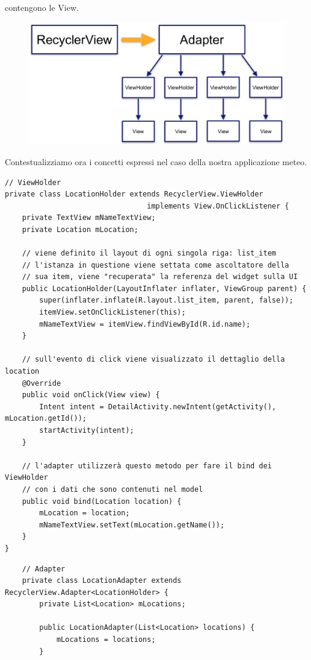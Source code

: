 \documentclass{article}
\begin{document}
\begin{itemize}
    contengono le View.
    \begin{figure}[H]
        \center
        \includegraphics[scale=0.28]{images/fig2.png}
    \end{figure}
    Contestualizziamo ora i concetti espressi nel caso della nostra applicazione meteo.
    \begin{lstlisting}
// ViewHolder
private class LocationHolder extends RecyclerView.ViewHolder
                                 implements View.OnClickListener {
    private TextView mNameTextView;
    private Location mLocation;

    // viene definito il layout di ogni singola riga: list_item
    // l'istanza in questione viene settata come ascoltatore della
    // sua item, viene "recuperata" la referenza del widget sulla UI
    public LocationHolder(LayoutInflater inflater, ViewGroup parent) {
        super(inflater.inflate(R.layout.list_item, parent, false));
        itemView.setOnClickListener(this);
        mNameTextView = itemView.findViewById(R.id.name);
    }

    // sull'evento di click viene visualizzato il dettaglio della location
    @Override
    public void onClick(View view) {
        Intent intent = DetailActivity.newIntent(getActivity(), mLocation.getId());
        startActivity(intent);
    }

    // l'adapter utilizzerà questo metodo per fare il bind dei ViewHolder
    // con i dati che sono contenuti nel model
    public void bind(Location location) {
        mLocation = location;
        mNameTextView.setText(mLocation.getName());
    }
}
    \end{lstlisting}
\begin{lstlisting}
    // Adapter
    private class LocationAdapter extends RecyclerView.Adapter<LocationHolder> {
        private List<Location> mLocations;

        public LocationAdapter(List<Location> locations) {
            mLocations = locations;
        }


\end{lstlisting}
\end{itemize}
\end{document}
